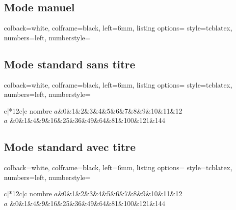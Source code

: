 \subsection{Mode manuel}

\begin{tcblisting}{
    colback=white,
    colframe=black,
    left=6mm,
    listing options={
        style=tcblatex,
        numbers=left,
        numberstyle=\tiny\color{red!75!black}
    }
}
\end{tcblisting}
\subsection{Mode standard sans titre}
\begin{tcblisting}{
    colback=white,
    colframe=black,
    left=6mm,
    listing options={
        style=tcblatex,
        numbers=left,
        numberstyle=\tiny\color{red!75!black}
    }
}
\begin{tcbtab}{c|*{12}{c|}c}%
    nombre $a$&0&1&2&3&4&5&6&7&8&9&10&11&12\\
    \hline
    $a$ &0&1&4&9&16&25&36&49&64&81&100&121&144\\
\end{tcbtab}
\end{tcblisting}
\subsection{Mode standard avec titre}
\begin{tcblisting}{
    colback=white,
    colframe=black,
    left=6mm,
    listing options={
        style=tcblatex,
        numbers=left,
        numberstyle=\tiny\color{red!75!black}
    }
}
\begin{tcbtab}{c|*{12}{c|}c}%
    nombre $a$&0&1&2&3&4&5&6&7&8&9&10&11&12\\
    \hline
    $a$ &0&1&4&9&16&25&36&49&64&81&100&121&144\\
\end{tcbtab}
\end{tcblisting}


